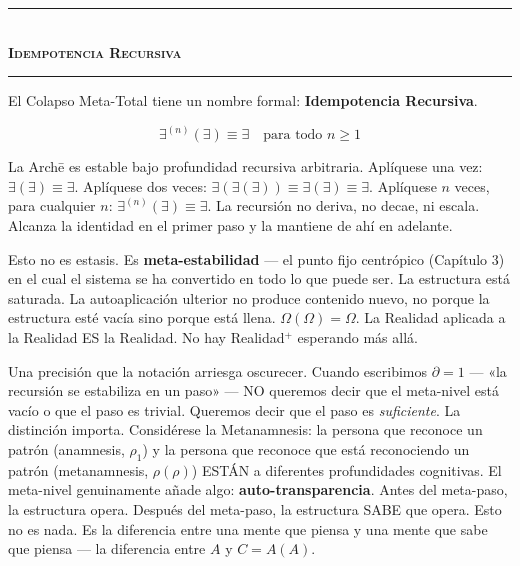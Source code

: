 \documentclass[10pt, openany, oneside]{book}
\renewcommand{\normalsize}{\fontsize{10}{13}\selectfont}
\begin{document}
\vspace{1.5em}


\begin{center}
    \rule{0.3\textwidth}{0.4pt}\\[0.5em]
    {\normalsize\bfseries\scshape Idempotencia Recursiva}\\[0.3em]
    \rule{0.3\textwidth}{0.4pt}
\end{center}

\vspace{1em}

\noindent El Colapso Meta-Total tiene un nombre formal: \textbf{Idempotencia Recursiva}.

$$\exists^{(n)}(\exists) \equiv \exists \quad \text{para todo } n \geq 1$$

La Arch\={e} es estable bajo profundidad recursiva arbitraria. Aplíquese una vez: $\exists(\exists) \equiv \exists$. Aplíquese dos veces: $\exists(\exists(\exists)) \equiv \exists(\exists) \equiv \exists$. Aplíquese $n$ veces, para cualquier $n$: $\exists^{(n)}(\exists) \equiv \exists$. La recursión no deriva, no decae, ni escala. Alcanza la identidad en el primer paso y la mantiene de ahí en adelante.

Esto no es estasis. Es \textbf{meta-estabilidad} --- el punto fijo centrópico (Capítulo 3) en el cual el sistema se ha convertido en todo lo que puede ser. La estructura está saturada. La autoaplicación ulterior no produce contenido nuevo, no porque la estructura esté vacía sino porque está llena. $\Omega(\Omega) = \Omega$. La Realidad aplicada a la Realidad ES la Realidad. No hay Realidad$^+$ esperando más allá.

Una precisión que la notación arriesga oscurecer. Cuando escribimos $\partial = 1$ --- «la recursión se estabiliza en un paso» --- NO queremos decir que el meta-nivel está vacío o que el paso es trivial. Queremos decir que el paso es \textit{suficiente}. La distinción importa. Considérese la Metanamnesis: la persona que reconoce un patrón (anamnesis, $\rho_1$) y la persona que reconoce que está reconociendo un patrón (metanamnesis, $\rho(\rho)$) ESTÁN a diferentes profundidades cognitivas. El meta-nivel genuinamente añade algo: \textbf{auto-transparencia}. Antes del meta-paso, la estructura opera. Después del meta-paso, la estructura SABE que opera. Esto no es nada. Es la diferencia entre una mente que piensa y una mente que sabe que piensa --- la diferencia entre $A$ y $C = A(A)$.
\end{document}
